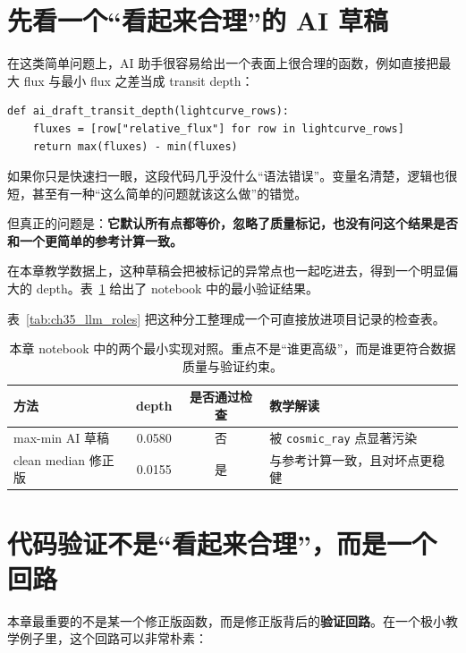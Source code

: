 \section{先看一个“看起来合理”的 AI 草稿}

在这类简单问题上，AI 助手很容易给出一个表面上很合理的函数，例如直接把最大 flux 与最小 flux 之差当成 transit depth：

\begin{examplebox}[一个常见但脆弱的 AI 草稿]
\begin{lstlisting}[style=pythonstyle]
def ai_draft_transit_depth(lightcurve_rows):
    fluxes = [row["relative_flux"] for row in lightcurve_rows]
    return max(fluxes) - min(fluxes)
\end{lstlisting}
\end{examplebox}

如果你只是快速扫一眼，这段代码几乎没什么“语法错误”。变量名清楚，逻辑也很短，甚至有一种“这么简单的问题就该这么做”的错觉。

但真正的问题是：\textbf{它默认所有点都等价，忽略了质量标记，也没有问这个结果是否和一个更简单的参考计算一致。}

在本章教学数据上，这种草稿会把被标记的异常点也一起吃进去，得到一个明显偏大的 depth。表~\ref{tab:ch35_draft_vs_verified} 给出了 notebook 中的最小验证结果。

表~\ref{tab:ch35_llm_roles} 把这种分工整理成一个可直接放进项目记录的检查表。

\begin{table}[htbp]
\centering
\small
\begin{tabular}{p{}ccp{}}
\toprule
方法 & depth & 是否通过检查 & 教学解读 \\
\midrule
max-min AI 草稿 & 0.0580 & 否 & 被 \texttt{cosmic\_ray} 点显著污染 \\
clean median 修正版 & 0.0155 & 是 & 与参考计算一致，且对坏点更稳健 \\
\bottomrule
\end{tabular}
\caption{本章 notebook 中的两个最小实现对照。重点不是“谁更高级”，而是谁更符合数据质量与验证约束。}
\label{tab:ch35_draft_vs_verified}
\end{table}

\section{代码验证不是“看起来合理”，而是一个回路}

本章最重要的不是某一个修正版函数，而是修正版背后的\textbf{验证回路}。在一个极小教学例子里，这个回路可以非常朴素：

